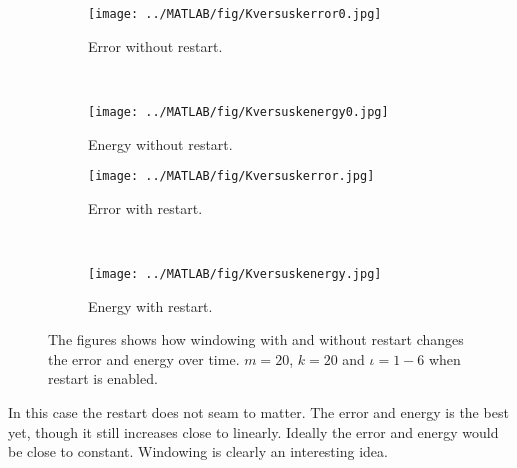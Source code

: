 \begin{figure}[H]
        \centering
        \begin{subfigure}[b]{0.45\textwidth}
                \texttt{[image: ../MATLAB/fig/Kversuskerror0.jpg]}
                \caption{ Error without restart. }
                \label{fig:Kversuskerror0}
        \end{subfigure}
		~
		\begin{subfigure}[b]{0.45\textwidth}
                \texttt{[image: ../MATLAB/fig/Kversuskenergy0.jpg]}
                \caption{ Energy without restart. }
                \label{fig:Kversuskenergy0}
        \end{subfigure}

        \begin{subfigure}[b]{0.45\textwidth}
                \texttt{[image: ../MATLAB/fig/Kversuskerror.jpg]}
                \caption{ Error with restart. }
                \label{fig:Kversuskerror}
        \end{subfigure}
		~
		\begin{subfigure}[b]{0.45\textwidth}
                \texttt{[image: ../MATLAB/fig/Kversuskenergy.jpg]}
                \caption{ Energy with restart. }
                \label{fig:Kversuskenergy}
        \end{subfigure}        
        
        \caption{ The figures shows how windowing with and without restart changes the error and energy over time. $m = 20$, $k= 20$ and $\iota = 1-6$ when restart is enabled. }
        \label{fig:Kversusk}
\end{figure}
In this case the restart does not seam to matter. The error and energy is the best yet, though it still increases close to linearly. Ideally the error and energy would be close to constant. Windowing is clearly an interesting idea.%
